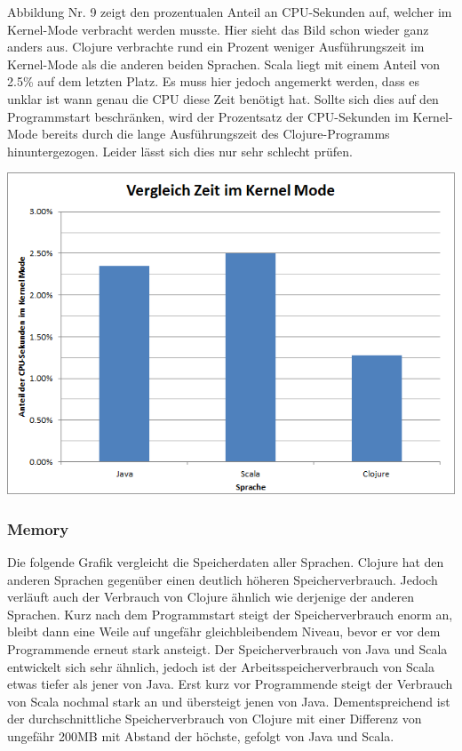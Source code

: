 \documentclass{fancydocument}
\begin{document}
Abbildung Nr. 9 zeigt den prozentualen Anteil an CPU-Sekunden auf, welcher im Kernel-Mode verbracht werden musste. Hier sieht das Bild schon wieder ganz anders aus. Clojure verbrachte rund ein Prozent weniger Ausführungszeit im Kernel-Mode als die anderen beiden Sprachen. Scala liegt mit einem Anteil von 2.5\% auf dem letzten Platz. Es muss hier jedoch angemerkt werden, dass es unklar ist wann genau die CPU diese Zeit benötigt hat. Sollte sich dies auf den Programmstart beschränken, wird der Prozentsatz der CPU-Sekunden im Kernel-Mode bereits durch die lange Ausführungszeit des Clojure-Programms hinuntergezogen. Leider lässt sich dies nur sehr schlecht prüfen.
\begin{center}
\includegraphics[width=\linewidth]{bilder/KernelModeAll.png}
\end{center}

\subsubsection{Memory}
Die folgende Grafik vergleicht die Speicherdaten aller Sprachen. Clojure hat den anderen Sprachen gegenüber einen deutlich höheren Speicherverbrauch. Jedoch verläuft auch der Verbrauch von Clojure  ähnlich wie derjenige der anderen Sprachen. Kurz nach dem Programmstart steigt der Speicherverbrauch enorm an, bleibt dann eine Weile auf ungefähr gleichbleibendem Niveau, bevor er vor dem Programmende erneut stark ansteigt. Der Speicherverbrauch von Java und Scala entwickelt sich sehr ähnlich, jedoch ist der Arbeitsspeicherverbrauch von Scala etwas tiefer als jener von Java. Erst kurz vor Programmende steigt der Verbrauch von Scala nochmal stark an und übersteigt jenen von Java. Dementspreichend ist der durchschnittliche Speicherverbrauch von Clojure mit einer Differenz von ungefähr 200MB mit Abstand der höchste, gefolgt von Java und Scala.
\end{document}

